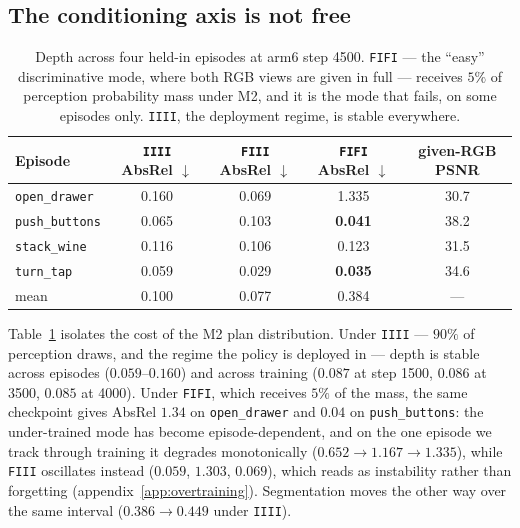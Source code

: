 \documentclass{article} %
\newcommand{\best}[1]{\textbf{#1}}
\newcommand{\tabref}[1]{Table~\ref{#1}}
\newcommand{\appref}[1]{appendix~\ref{#1}}
\begin{document}
\subsection{The conditioning axis is not free}
\label{sec:modegrid}

\begin{table}[t]
\caption{Depth across four held-in episodes at arm6 step 4500. \texttt{FIFI} --- the ``easy''
discriminative mode, where both RGB views are given in full --- receives $5\%$ of perception
probability mass under M2, and it is the mode that fails, on some episodes only. \texttt{IIII}, the
deployment regime, is stable everywhere.}
\label{tab:crosstask}
\begin{center}\small
\begin{tabular}{lcccc}
\toprule
\textbf{Episode} & \texttt{IIII} AbsRel $\downarrow$ & \texttt{FIII} AbsRel $\downarrow$ & \texttt{FIFI} AbsRel $\downarrow$ & given-RGB PSNR \\
\midrule
\texttt{open\_drawer}  & 0.160 & 0.069 & \textcolor{red!70!black}{1.335} & 30.7 \\
\texttt{push\_buttons} & 0.065 & 0.103 & \best{0.041} & 38.2 \\
\texttt{stack\_wine}   & 0.116 & 0.106 & 0.123 & 31.5 \\
\texttt{turn\_tap}     & 0.059 & 0.029 & \best{0.035} & 34.6 \\
\midrule
mean & 0.100 & 0.077 & 0.384 & --- \\
\bottomrule
\end{tabular}
\end{center}
\end{table}

\tabref{tab:crosstask} isolates the cost of the M2 plan distribution. Under \texttt{IIII} ---
$90\%$ of perception draws, and the regime the policy is deployed in --- depth is stable across
episodes ($0.059$--$0.160$) and across training ($0.087$ at step 1500, $0.086$ at 3500, $0.085$ at
4000). Under \texttt{FIFI}, which receives $5\%$ of the mass, the same checkpoint gives AbsRel
$1.34$ on \texttt{open\_drawer} and $0.04$ on \texttt{push\_buttons}: the under-trained mode has
become episode-dependent, and on the one episode we track through training it degrades
monotonically ($0.652 \to 1.167 \to 1.335$), while \texttt{FIII} oscillates instead ($0.059$,
$1.303$, $0.069$), which reads as instability rather than forgetting (\appref{app:overtraining}).
Segmentation moves the other way over the same interval ($0.386 \to 0.449$ under \texttt{IIII}).
\end{document}
